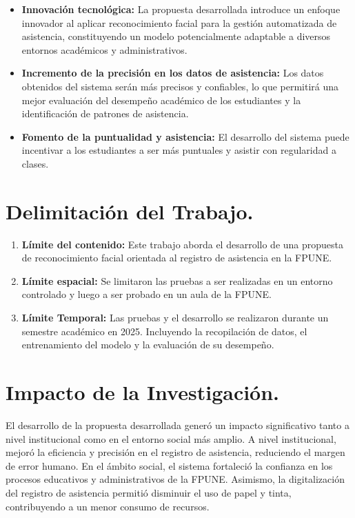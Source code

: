 \begin{itemize}
    \item \textbf{Innovación tecnológica:} La propuesta desarrollada introduce un enfoque innovador al aplicar reconocimiento facial para la gestión automatizada de asistencia, constituyendo un modelo potencialmente adaptable a diversos entornos académicos y administrativos.
    \item \textbf{Incremento de la precisión en los datos de asistencia:} Los datos
obtenidos del sistema serán más precisos y confiables, lo que permitirá
una mejor evaluación del desempeño académico de los estudiantes y la
identificación de patrones de asistencia.
    \item \textbf{Fomento de la puntualidad y asistencia:} El desarrollo del
    sistema puede incentivar a los estudiantes a ser más puntuales y asistir
    con regularidad a clases.
\end{itemize}


\section{Delimitación del Trabajo.}
\begin{enumerate}
    \item \textbf{Límite del contenido:} Este trabajo aborda el desarrollo de una propuesta de reconocimiento facial orientada al registro de asistencia en la FPUNE.
    \item \textbf{Límite espacial:} Se limitaron las pruebas a ser realizadas en un entorno
    controlado y luego a ser probado en un aula de la FPUNE.
    \item \textbf{Límite Temporal:} Las pruebas y el desarrollo se realizaron durante un semestre académico en 2025. Incluyendo la recopilación de datos, el entrenamiento del modelo y la evaluación de su desempeño.
\end{enumerate}


\section*{Impacto de la Investigación.}

El desarrollo de la propuesta desarrollada generó un impacto significativo tanto a nivel institucional como en el entorno social más amplio. A nivel institucional, mejoró la eficiencia y precisión en el registro de asistencia, reduciendo el margen de error humano. En el ámbito social, el sistema fortaleció la confianza en los procesos educativos y administrativos de la FPUNE. Asimismo, la digitalización del registro de asistencia permitió disminuir el uso de papel y tinta, contribuyendo a un menor consumo de recursos.